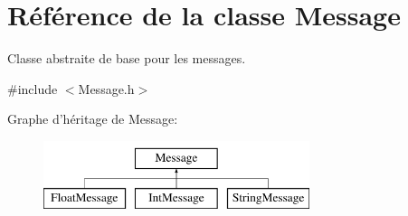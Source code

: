 \hypertarget{classMessage}{\section{Référence de la classe Message}
\label{classMessage}
}


Classe abstraite de base pour les messages.  




{\ttfamily \#include $<$Message.\-h$>$}

Graphe d'héritage de Message\-:\begin{figure}[H]
\begin{center}
\leavevmode
\includegraphics[height=2.000000cm]{classMessage}
\end{center}
\end{figure}
